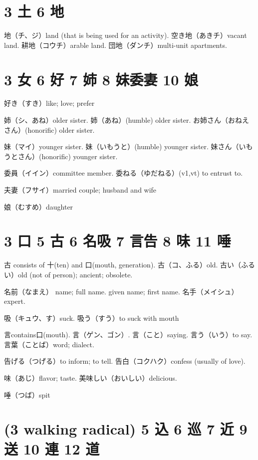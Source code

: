 \section{3 土 6 地}

地（チ、ジ）land (that is being used for an activity).
空き地（あきチ）vacant land.
耕地（コウチ）arable land.
団地（ダンチ）multi-unit apartments.

\section{3 女 6 好 7 姉 8 妹委妻 10 娘}

好き（すき）like; love; prefer

姉（シ、あね）older sister.
姉（あね）(humble) older sister.
お姉さん（おねえさん）(honorific) older sister.

妹（マイ）younger sister.
妹（いもうと）(humble) younger sister.
妹さん（いもうとさん）(honorific) younger sister.

委員（イイン）committee member.
委ねる（ゆだねる）(v1,vt) to entrust to.

夫妻（フサイ）married couple; husband and wife

娘（むすめ）daughter

\section{3 口 5 古 6 名吸 7 言告 8 味 11 唾}

古 consists of 十(ten) and 口(mouth, generation).
古（コ、ふる）old.
古い（ふるい）old (not of person); ancient; obsolete.

名前（なまえ）
name; full name.
given name; first name.
名手（メイシュ）expert.

吸（キュウ、す）suck.
吸う（すう）to suck with mouth

言contains口(mouth).
言（ゲン、ゴン）.
言（こと）saying.
言う（いう）to say.
言葉（ことば）word; dialect.

告げる（つげる）to inform; to tell.
告白（コクハク）confess (usually of love).

味（あじ）flavor; taste.
美味しい（おいしい）delicious.

唾（つば）spit

\section{(3 walking radical) 5 込 6 巡 7 近 9 送 10 連 12 道}


